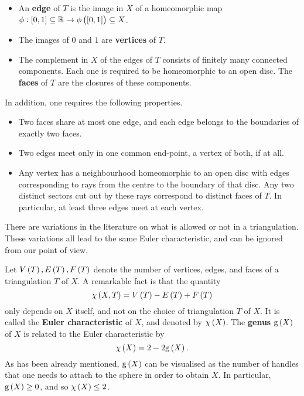 \begin{itemize}
\item An \textbf{edge} of $ T $ is the image in $ X $ of a homeomorphic map $ \phi : \sbr{0, 1} \subseteq \RR \to \phi\br{\sbr{0, 1}} \subseteq X $.
\item The images of $ 0 $ and $ 1 $ are \textbf{vertices} of $ T $.
\item The complement in $ X $ of the edges of $ T $ consists of finitely many connected components. Each one is required to be homeomorphic to an open disc. The \textbf{faces} of $ T $ are the closures of these components.
\end{itemize}
In addition, one requires the following properties.
\begin{itemize}
\item Two faces share at most one edge, and each edge belongs to the boundaries of exactly two faces.
\item Two edges meet only in one common end-point, a vertex of both, if at all.
\item Any vertex has a neighbourhood homeomorphic to an open disc with edges corresponding to rays from the centre to the boundary of that disc. Any two distinct sectors cut out by these rays correspond to distinct faces of $ T $. In particular, at least three edges meet at each vertex.
\end{itemize}

\begin{remark}
There are variations in the literature on what is allowed or not in a triangulation. These variations all lead to the same Euler characteristic, and can be ignored from our point of view.
\end{remark}

Let $ V\br{T}, E\br{T}, F\br{T} $ denote the number of vertices, edges, and faces of a triangulation $ T $ of $ X $. A remarkable fact is that the quantity
$$ \chi\br{X, T} = V\br{T} - E\br{T} + F\br{T} $$
only depends on $ X $ itself, and not on the choice of triangulation $ T $ of $ X $. It is called the \textbf{Euler characteristic} of $ X $, and denoted by $ \chi\br{X} $. The \textbf{genus} $ \g\br{X} $ of $ X $ is related to the Euler characteristic by
$$ \chi\br{X} = 2 - 2\g\br{X}. $$
As has been already mentioned, $ \g\br{X} $ can be visualised as the number of handles that one needs to attach to the sphere in order to obtain $ X $. In particular, $ \g\br{X} \ge 0 $, and so $ \chi\br{X} \le 2 $.

\pagebreak

